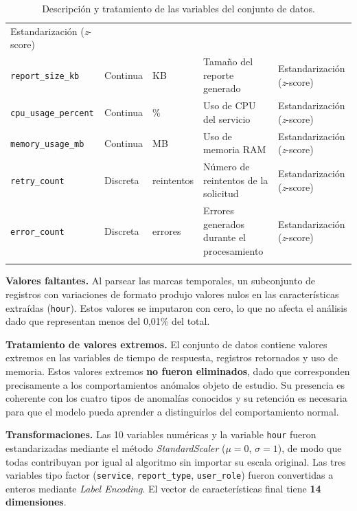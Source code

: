 \documentclass[12pt,letterpaper, oneside]{book}
\begin{document}
\begin{longtable}{p{3.8cm}p{1.8cm}p{1.5cm}p{4.2cm}p{2.5cm}}
        Estandarización (\textit{z}-score) \\
    \texttt{report\_size\_kb} & Continua & KB &
        Tamaño del reporte generado &
        Estandarización (\textit{z}-score) \\
    \texttt{cpu\_usage\_percent} & Continua & \% &
        Uso de CPU del servicio &
        Estandarización (\textit{z}-score) \\
    \texttt{memory\_usage\_mb} & Continua & MB &
        Uso de memoria RAM &
        Estandarización (\textit{z}-score) \\
    \texttt{retry\_count} & Discreta & reintentos &
        Número de reintentos de la solicitud &
        Estandarización (\textit{z}-score) \\
    \texttt{error\_count} & Discreta & errores &
        Errores generados durante el procesamiento &
        Estandarización (\textit{z}-score) \\
    \bottomrule
    \caption{Descripción y tratamiento de las variables del conjunto de datos.}
    \label{tab:variables}
    \end{longtable}

    \textbf{Valores faltantes.} Al parsear las marcas temporales, un
    subconjunto de registros con variaciones de formato produjo valores
    nulos en las características extraídas (\texttt{hour}). Estos valores
    se imputaron con cero, lo que no afecta el análisis dado que representan
    menos del 0,01\% del total.

    \textbf{Tratamiento de valores extremos.} El conjunto de datos contiene
    valores extremos en las variables de tiempo de respuesta, registros
    retornados y uso de memoria. Estos valores extremos \textbf{no fueron
    eliminados}, dado que corresponden precisamente a los comportamientos
    anómalos objeto de estudio. Su presencia es coherente con los cuatro
    tipos de anomalías conocidos y su retención es necesaria para que el
    modelo pueda aprender a distinguirlos del comportamiento normal.

    \textbf{Transformaciones.} Las 10 variables numéricas y la variable
    \texttt{hour} fueron estandarizadas mediante el método
    \textit{StandardScaler} ($\mu = 0$, $\sigma = 1$), de modo que todas
    contribuyan por igual al algoritmo sin importar su escala original.
    Las tres variables tipo factor (\texttt{service}, \texttt{report\_type},
    \texttt{user\_role}) fueron convertidas a enteros mediante
    \textit{Label Encoding}. El vector de características final tiene
    \textbf{14 dimensiones}.
\end{document}
